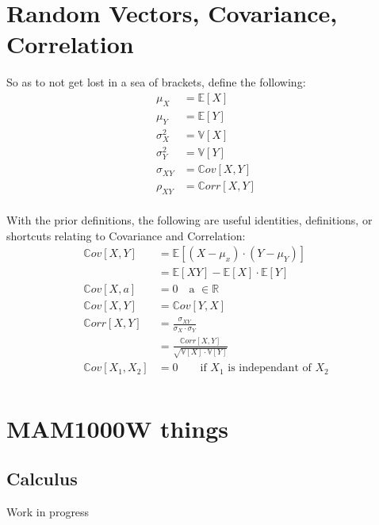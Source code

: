 \section{Random Vectors, Covariance, Correlation}
So as to not get lost in a sea of brackets, define the following:
\begin{equation*}
    \begin{aligned}
        \mu_X &= \mathbb{E}[X] \\
        \mu_Y &= \mathbb{E}[Y] \\
        \sigma_X^2 &= \mathbb{V}[X] \\
        \sigma_Y^2 &= \mathbb{V}[Y] \\
        \sigma_{XY} &= \mathbb{C}ov[X, Y]  \\
        \rho_{XY} &= \mathbb{C}orr[X, Y]  \\
    \end{aligned}
\end{equation*}

With the prior definitions, the following are useful identities, definitions,
or shortcuts relating to Covariance and Correlation:
\begin{equation*}
    \begin{aligned}
        \mathbb{C}ov[X, Y] &= \mathbb{E}[(X - \mu_x)\cdot(Y - \mu_Y)] \\
                  &= \mathbb{E}[XY] - \mathbb{E}[X] \cdot \mathbb{E}[Y] \\
        \mathbb{C}ov[X, a] &= 0 \quad \text{a } \in \mathbb{R} \\
        \mathbb{C}ov[X, Y] &= \mathbb{C}ov[Y, X] \\
        \mathbb{C}orr[X, Y] &= \frac{\sigma_{XY}}{\sigma_X \cdot \sigma_Y}\\
            &= \frac{ \mathbb{C}orr[X, Y] }{ \sqrt{ \mathbb{V}[X] \cdot \mathbb{V}[Y] }} \\
        \mathbb{C}ov[X_1, X_2] &= 0 \qquad \text{if $X_1$ is independant of
        $X_2$}\\
    \end{aligned}
\end{equation*}
    

\section{MAM1000W things}
\subsection{Calculus}
Work in progress
%        

